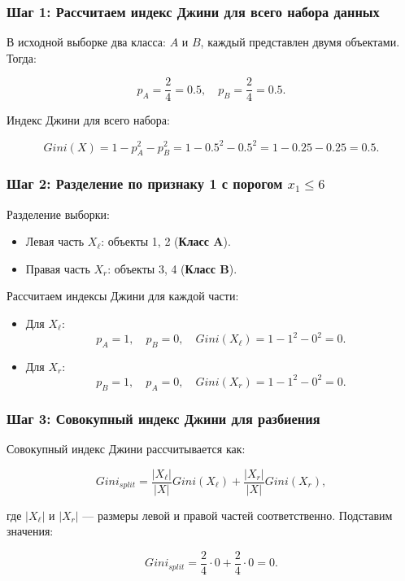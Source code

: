 \begin{solution}
\subsubsection*{Шаг 1: Рассчитаем индекс Джини для всего набора данных}
    В исходной выборке два класса: $A$ и $B$, каждый представлен двумя объектами. Тогда:

\[
p_A = \frac{2}{4} = 0.5, \quad p_B = \frac{2}{4} = 0.5.
\]

Индекс Джини для всего набора:

\[
Gini(X) = 1 - p_A^2 - p_B^2 = 1 - 0.5^2 - 0.5^2 = 1 - 0.25 - 0.25 = 0.5.
\]

\subsubsection*{Шаг 2: Разделение по признаку 1 с порогом $x_1 \leq 6$}

Разделение выборки:
\begin{itemize}
    \item Левая часть $X_\ell$: объекты 1, 2 (\textbf{Класс A}).
    \item Правая часть $X_r$: объекты 3, 4 (\textbf{Класс B}).
\end{itemize}

\noindent Рассчитаем индексы Джини для каждой части:
\begin{itemize}
    \item Для $X_\ell$:
    \[
    p_A = 1, \quad p_B = 0, \quad Gini(X_\ell) = 1 - 1^2 - 0^2 = 0.
    \]

    \item Для $X_r$:
    \[
    p_B = 1, \quad p_A = 0, \quad Gini(X_r) = 1 - 1^2 - 0^2 = 0.
    \]
\end{itemize}

\subsubsection*{Шаг 3: Совокупный индекс Джини для разбиения}

Совокупный индекс Джини рассчитывается как:

\[
Gini_{split} = \frac{|X_\ell|}{|X|} Gini(X_\ell) + \frac{|X_r|}{|X|} Gini(X_r),
\]

где $|X_\ell|$ и $|X_r|$ — размеры левой и правой частей соответственно. Подставим значения:

\[
Gini_{split} = \frac{2}{4} \cdot 0 + \frac{2}{4} \cdot 0 = 0.
\]


\end{solution}
